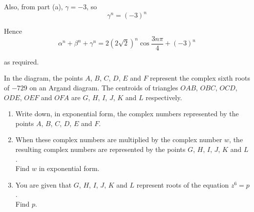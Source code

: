 \documentclass[leqno]{article}
\begin{document}
\begin{enumerate}[
  label=\textbf{\arabic*.},
  leftmargin=*,
  topsep=0pt,
  partopsep=0pt,
  parsep=0pt
]
\begin{djsSolution}
\begin{enumerate}[label=\textbf{(\alph*)}]
\begin{enumerate}[label=(\roman*)]
    Also, from part (a), $\gamma=-3$, so
    \[
    \gamma^n=(-3)^n
    \]

    Hence
    \[
    \alpha^n+\beta^n+\gamma^n=2(2\sqrt{2})^n\cos\frac{3n\pi}{4}+(-3)^n
    \]

    as required.
  \end{enumerate}
\end{enumerate}
\end{djsSolution}


\newpage

\questionitem

\begin{figure}[H]
    \centering
{}
\end{figure}


In the diagram, the points $A$, $B$, $C$, $D$, $E$ and $F$ represent the complex sixth roots of $-729$ on an Argand diagram. The centroids of triangles $OAB$, $OBC$, $OCD$, $ODE$, $OEF$ and $OFA$ are $G$, $H$, $I$, $J$, $K$ and $L$ respectively. \\
\begin{enumerate}[label=\textbf{(\alph*)}]
  \item Write down, in exponential form, the complex numbers represented by the points $A$, $B$, $C$, $D$, $E$ and $F$.  \\
  \item When these complex numbers are multiplied by the complex number $w$, the resulting complex numbers are represented by the points $G$, $H$, $I$, $J$, $K$ and $L$. \\
  Find $w$ in exponential form.  \\
  \item You are given that $G$, $H$, $I$, $J$, $K$ and $L$ represent roots of the equation $z^6=p$. \\
  Find $p$.  \\
\end{enumerate}


\end{enumerate}
\end{document}
